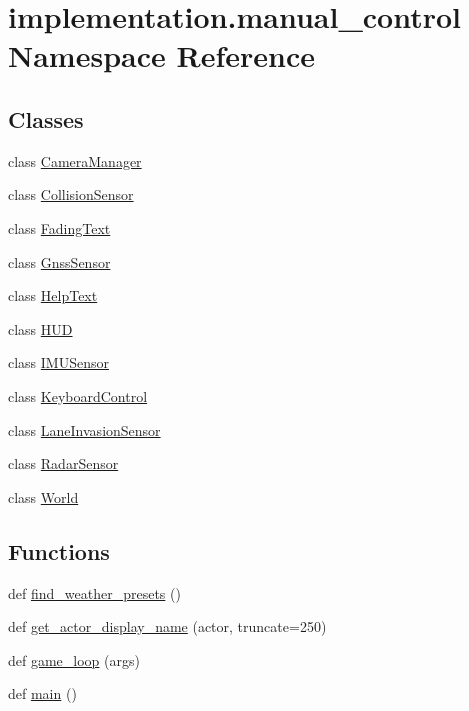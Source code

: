 \hypertarget{namespaceimplementation_1_1manual__control}{}\section{implementation.\+manual\+\_\+control Namespace Reference}
\label{namespaceimplementation_1_1manual__control}
\subsection*{Classes}
\begin{DoxyCompactItemize}
\item 
class \hyperlink{classimplementation_1_1manual__control_1_1_camera_manager}{Camera\+Manager}
\item 
class \hyperlink{classimplementation_1_1manual__control_1_1_collision_sensor}{Collision\+Sensor}
\item 
class \hyperlink{classimplementation_1_1manual__control_1_1_fading_text}{Fading\+Text}
\item 
class \hyperlink{classimplementation_1_1manual__control_1_1_gnss_sensor}{Gnss\+Sensor}
\item 
class \hyperlink{classimplementation_1_1manual__control_1_1_help_text}{Help\+Text}
\item 
class \hyperlink{classimplementation_1_1manual__control_1_1_h_u_d}{H\+UD}
\item 
class \hyperlink{classimplementation_1_1manual__control_1_1_i_m_u_sensor}{I\+M\+U\+Sensor}
\item 
class \hyperlink{classimplementation_1_1manual__control_1_1_keyboard_control}{Keyboard\+Control}
\item 
class \hyperlink{classimplementation_1_1manual__control_1_1_lane_invasion_sensor}{Lane\+Invasion\+Sensor}
\item 
class \hyperlink{classimplementation_1_1manual__control_1_1_radar_sensor}{Radar\+Sensor}
\item 
class \hyperlink{classimplementation_1_1manual__control_1_1_world}{World}
\end{DoxyCompactItemize}
\subsection*{Functions}
\begin{DoxyCompactItemize}
\item 
def \hyperlink{namespaceimplementation_1_1manual__control_a31d63a6ec0a8fffd396acec38fd0391b}{find\+\_\+weather\+\_\+presets} ()
\item 
def \hyperlink{namespaceimplementation_1_1manual__control_acee66c1e4d070adf8b6534446a3c5f36}{get\+\_\+actor\+\_\+display\+\_\+name} (actor, truncate=250)
\item 
def \hyperlink{namespaceimplementation_1_1manual__control_ad0b5729ea03bd80da58672b4bbce7f41}{game\+\_\+loop} (args)
\item 
def \hyperlink{namespaceimplementation_1_1manual__control_a34212fc7e38fc4b7badc73dbd015f55a}{main} ()
\end{DoxyCompactItemize}


